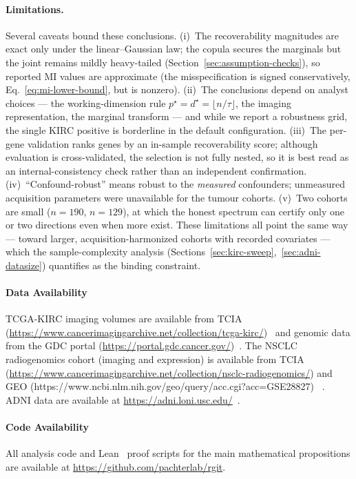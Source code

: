 \documentclass{article}
\begin{document}
\paragraph{Limitations.}
Several caveats bound these conclusions. (i)~The recoverability magnitudes are
exact only under the linear--Gaussian law; the copula secures the marginals but
the joint remains mildly heavy-tailed (Section~\ref{sec:assumption-checks}), so
reported MI values are approximate (the misspecification is signed conservatively,
Eq.~\eqref{eq:mi-lower-bound}, but is nonzero). (ii)~The conclusions depend on
analyst choices --- the working-dimension rule $p^\star=d^\star=\lfloor n/\tau\rfloor$,
the imaging representation, the marginal transform --- and while we report a
robustness grid, the single KIRC positive is borderline in the default
configuration. (iii)~The per-gene validation ranks genes by an in-sample
recoverability score; although evaluation is cross-validated, the selection is
not fully nested, so it is best read as an internal-consistency check rather than
an independent confirmation. (iv)~``Confound-robust'' means robust to the
\emph{measured} confounders; unmeasured acquisition parameters were unavailable
for the tumour cohorts. (v)~Two cohorts are small ($n=190$, $n=129$), at which
the honest spectrum can certify only one or two directions even when more exist.
These limitations all point the same way --- toward larger, acquisition-harmonized
cohorts with recorded covariates --- which the sample-complexity analysis
(Sections~\ref{sec:kirc-sweep},~\ref{sec:adni-datasize}) quantifies as the binding
constraint.

\paragraph{Data Availability}
TCGA-KIRC imaging volumes are available from TCIA (\url{https://www.cancerimagingarchive.net/collection/tcga-kirc/})~\citep{clark2013tcia,tcgakirc_tcia} and genomic data from the GDC portal (\url{https://portal.gdc.cancer.gov/})~\citep{ricketts2018tcgakirc}.
The NSCLC radiogenomics cohort (imaging and expression) is available from TCIA (\url{https://www.cancerimagingarchive.net/collection/nsclc-radiogenomics/}) and GEO (https://www.ncbi.nlm.nih.gov/geo/query/acc.cgi?acc=GSE28827) ~\citep{bakr2018nsclcradiogenomics}.
ADNI data are available at \url{https://adni.loni.usc.edu/}~\citep{petersen2010adni}.

\paragraph{Code Availability}
All analysis code and Lean~\citep{moura2021lean4} proof scripts for the main mathematical propositions are available at \url{https://github.com/pachterlab/rgit}.
\end{document}
